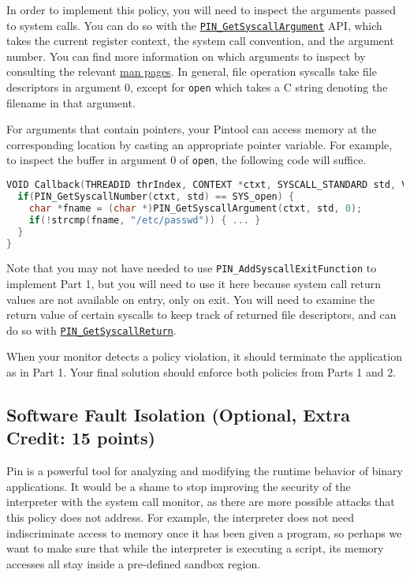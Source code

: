\documentclass[11pt]{article}
\begin{document}
In order to implement this policy, you will need to inspect the arguments passed to system calls. You can do so with the \href{https://software.intel.com/sites/landingpage/pintool/docs/81205/Pin/html/group__PIN__SYSCALL__API.html#gd38043f1ae2f1198b7f3b233218593d4}{\texttt{PIN\_GetSyscallArgument}} API, which takes the current register context, the system call convention, and the argument number. You can find more information on which arguments to inspect by consulting the relevant \href{http://man7.org/linux/man-pages/man2/syscalls.2.html}{man pages}. In general, file operation syscalls take file descriptors in argument 0, except for \verb'open' which takes a C string denoting the filename in that argument. 

For arguments that contain pointers, your Pintool can access memory at the corresponding location by casting an appropriate pointer variable. For example, to inspect the buffer in argument 0 of \verb'open', the following code will suffice.
\begin{lstlisting}[basicstyle=\footnotesize\ttfamily,language=C,keywordstyle=\bfseries\color{green!40!black}, commentstyle=\itshape\color{purple!40!black},stringstyle=\color{orange}]
VOID Callback(THREADID thrIndex, CONTEXT *ctxt, SYSCALL_STANDARD std, VOID *v) {
  if(PIN_GetSyscallNumber(ctxt, std) == SYS_open) {
    char *fname = (char *)PIN_GetSyscallArgument(ctxt, std, 0);
    if(!strcmp(fname, "/etc/passwd")) { ... }
  }
}
\end{lstlisting}

Note that you may not have needed to use \verb'PIN_AddSyscallExitFunction' to implement Part 1, but you will need to use it here because system call return values are not available on entry, only on exit. You will need to examine the return value of certain syscalls to keep track of returned file descriptors, and can do so with \href{https://software.intel.com/sites/landingpage/pintool/docs/81205/Pin/html/group__PIN__SYSCALL__API.html#g2b7ff20cfdcb54df003635e693944da1}{\texttt{PIN\_GetSyscallReturn}}.

When your monitor detects a policy violation, it should terminate the application as in Part 1. Your final solution should enforce both policies from Parts 1 and 2.

\subsection{Software Fault Isolation (Optional, Extra Credit: 15 points)}
Pin is a powerful tool for analyzing and modifying the runtime behavior of binary applications. It would be a shame to stop improving the security of the interpreter with the system call monitor, as there are more possible attacks that this policy does not address. For example, the interpreter does not need indiscriminate access to memory once it has been given a program, so perhaps we want to make sure that while the interpreter is executing a script, its memory accesses all stay inside a pre-defined sandbox region.
\end{document}

